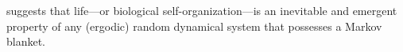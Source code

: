 \documentclass[a4paper]{article}
\title{}
\date{}
\begin{document}
\maketitle
    \cite{friston-2013-life-as-we-know-it} suggests that life—or biological self-organization—is an inevitable and emergent property of any (ergodic) random dynamical system that possesses a Markov blanket.

    
    
    
\end{document}
